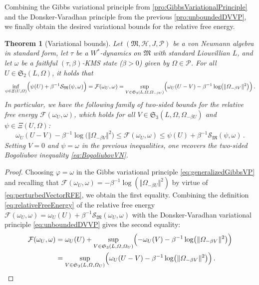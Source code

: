 \documentclass[a4paper, twoside, 11pt, reqno]{amsart}
\theoremstyle{definition}
\theoremstyle{plain}
\newtheorem{theorem}[definition]{Theorem}
\renewcommand{\Xi}{\varXi}
\renewcommand{\Omega}{\varOmega}
\newcommand{\MF}{\mathcal{F}}
\newcommand{\MH}{\mathcal{H}}
\newcommand{\MS}{\mathcal{S}}
\newcommand{\MFM}{\mathfrak{M}}
\newcommand{\MFS}{\mathfrak{S}}
\newcommand{\NPC}{\mathcal{P}}
\newcommand{\1}{\mathbf{1}}
\newcommand{\norm}[2][]{#1\Vert{#2}#1\Vert}
\newcommand{\inv}[1]{#1^{-1}}
\begin{document}
Combining the Gibbs variational principle from \cref{pro:GibbsVariationalPrinciple} and the Donsker-Varadhan principle from the previous \cref{pro:unboundedDVVP}, we finally obtain the desired variational bounds for the relative free energy.

\begin{theorem}[Variational bounds]\label{thm:variationalBoundsVN}
    Let $(\MFM, \MH, J, \NPC)$ be a von Neumann algebra in standard form, let $\tau$ be a $W^\ast$-dynamics on $\MFM$ with standard Liouvillian $L$, and let $\omega$ be a faithful $(\tau, \beta)$-KMS state ($\beta > 0$) given by $\Omega \in \NPC$. For all $U \in \MFS_2(L, \Omega)$, it holds that
    \begingroup
    \small
    \begin{equation*}
        \inf_{\psi \in \Xi(U, \Omega)} \Bigl(\psi(U) + \inv{\beta} \MS_\MFM(\psi, \omega)\Bigr) = \MF(\omega_U, \omega) = \sup_{V \in \MFS_3(L, \Omega, \Omega_{- \beta U})} \Bigl(\omega_U(U - V) - \inv{\beta} \log \bigl(\norm{\Omega_{- \beta V}}^2\bigr)\Bigr) \, .
    \end{equation*}
    \endgroup
    In particular, we have the following family of two-sided bounds for the relative free energy $\MF(\omega_U, \omega)$, which holds for all $V \in \MFS_3(L, \Omega, \Omega_{- \beta U})$ and $\psi \in \Xi(U, \Omega)$:
    \begin{equation}\label{eq:unboundedFamilyBounds}
        \omega_U(U - V) - \inv{\beta} \log\bigl(\norm{\Omega_{- \beta V}}^2\bigr) \le \MF(\omega_U, \omega) \le \psi(U) + \inv{\beta} \MS_\MFM(\psi, \omega) \, .
    \end{equation}
    Setting $V = 0$ and $\psi = \omega$ in the previous inequalities, one recovers the two-sided Bogoliubov inequality \eqref{eq:BogoliubovVN}.
\end{theorem}

\begin{proof}
    Choosing $\varphi = \omega$ in the Gibbs variational principle \eqref{eq:generalizedGibbsVP} and recalling that $\MF(\omega_U, \omega) = - \inv{\beta} \log (\norm{\Omega_{- \beta U}}^2)$ by virtue of \cref{eq:perturbedVectorRFE}, we obtain the first equality. Combining the definition \eqref{eq:relativeFreeEnergy} of the relative free energy $\MF(\omega_U, \omega) = \omega_U(U) + \inv{\beta} \MS_\MFM(\omega_U, \omega)$ with the Donsker-Varadhan variational principle \eqref{eq:unboundedDVVP} gives the second equality:
    \begin{align*}
        \MF(\omega_U, \omega) &= \omega_U(U) + \sup_{V \in \MFS_3(L, \Omega, \Omega_U)} \Bigl(- \omega_U(V) - \inv{\beta} \log \bigl(\norm{\Omega_{- \beta V}}^2\bigr)\Bigr) \\
        &= \sup_{V \in \MFS_3(L, \Omega, \Omega_U)} \Bigl(\omega_U(U - V) - \inv{\beta} \log \bigl(\norm{\Omega_{- \beta V}}^2\bigr)\Bigr) \, . \tag*{\qedhere}
    \end{align*}
\end{proof}
\end{document}
